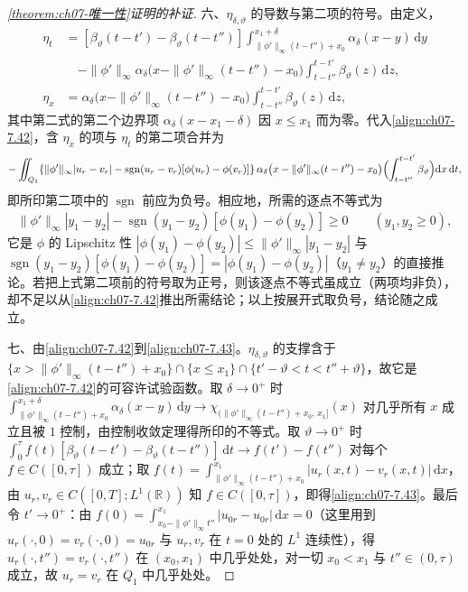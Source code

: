 \documentclass[../../main.tex]{subfiles}%
\begin{document}
\begin{proof}[\cref{theorem:ch07-唯一性}证明的补证]
六、$\eta_{\delta,\vartheta}$ 的导数与第二项的符号。由定义，
\begin{align*}
\eta_t&=[\beta_\vartheta(t-t')-\beta_\vartheta(t-t'')]\int_{\|\phi'\|_\infty(t-t'')+x_0}^{x_1+\delta}\alpha_\delta(x-y)\,\mathrm{d}y\\
&\quad-\|\phi'\|_\infty\alpha_\delta\bigl(x-\|\phi'\|_\infty(t-t'')-x_0\bigr)\int_{t-t''}^{t-t'}\beta_\vartheta(z)\,\mathrm{d}z,\\
\eta_x&=\alpha_\delta\bigl(x-\|\phi'\|_\infty(t-t'')-x_0\bigr)\int_{t-t''}^{t-t'}\beta_\vartheta(z)\,\mathrm{d}z,
\end{align*}
其中第二式的第二个边界项 $\alpha_\delta(x-x_1-\delta)$ 因 $x\leqslant x_1$ 而为零。代入\eqref{align:ch07-7.42}，含 $\eta_x$ 的项与 $\eta_t$ 的第二项合并为
\begin{align*}
-\iint_{Q_1}\{\|\phi'\|_\infty|u_r-v_r|-\operatorname{sgn}(u_r-v_r)[\phi(u_r)-\phi(v_r)]\}\,\alpha_\delta\bigl(x-\|\phi'\|_\infty(t-t'')-x_0\bigr)\Bigl(\int_{t-t''}^{t-t'}\beta_\vartheta\Bigr)\mathrm{d}x\,\mathrm{d}t,
\end{align*}
即所印第二项中的 $\operatorname{sgn}$ 前应为负号。相应地，所需的逐点不等式为
\begin{align*}
\|\phi'\|_\infty|y_1-y_2|-\operatorname{sgn}(y_1-y_2)[\phi(y_1)-\phi(y_2)]\geqslant0\qquad(y_1,y_2\geqslant0),
\end{align*}
它是 $\phi$ 的 Lipschitz 性 $|\phi(y_1)-\phi(y_2)|\leqslant\|\phi'\|_\infty|y_1-y_2|$ 与 $\operatorname{sgn}(y_1-y_2)[\phi(y_1)-\phi(y_2)]=|\phi(y_1)-\phi(y_2)|$（$y_1\ne y_2$）的直接推论。若把上式第二项前的符号取为正号，则该逐点不等式虽成立（两项均非负），却不足以从\eqref{align:ch07-7.42}推出所需结论；以上按展开式取负号，结论随之成立。

七、由\eqref{align:ch07-7.42}到\eqref{align:ch07-7.43}。$\eta_{\delta,\vartheta}$ 的支撑含于 $\{x>\|\phi'\|_\infty(t-t'')+x_0\}\cap\{x\leqslant x_1\}\cap\{t'-\vartheta<t<t''+\vartheta\}$，故它是\eqref{align:ch07-7.42}的可容许试验函数。取 $\delta\to0^+$ 时 $\int_{\|\phi'\|_\infty(t-t'')+x_0}^{x_1+\delta}\alpha_\delta(x-y)\,\mathrm{d}y\to\chi_{(\|\phi'\|_\infty(t-t'')+x_0,\,x_1]}(x)$ 对几乎所有 $x$ 成立且被 $1$ 控制，由控制收敛定理得所印的不等式。取 $\vartheta\to0^+$ 时 $\int_0^\tau f(t)[\beta_\vartheta(t-t')-\beta_\vartheta(t-t'')]\,\mathrm{d}t\to f(t')-f(t'')$ 对每个 $f\in C([0,\tau])$ 成立；取 $f(t)=\int_{\|\phi'\|_\infty(t-t'')+x_0}^{x_1}|u_r(x,t)-v_r(x,t)|\,\mathrm{d}x$，由 $u_r,v_r\in C([0,T];L^1(\mathbb{R}))$ 知 $f\in C([0,\tau])$，即得\eqref{align:ch07-7.43}。最后令 $t'\to0^+$：由 $f(0)=\int_{x_0-\|\phi'\|_\infty t''}^{x_1}|u_{0r}-u_{0r}|\,\mathrm{d}x=0$（这里用到 $u_r(\cdot,0)=v_r(\cdot,0)=u_{0r}$ 与 $u_r,v_r$ 在 $t=0$ 处的 $L^1$ 连续性），得 $u_r(\cdot,t'')=v_r(\cdot,t'')$ 在 $(x_0,x_1)$ 中几乎处处，对一切 $x_0<x_1$ 与 $t''\in(0,\tau)$ 成立，故 $u_r=v_r$ 在 $Q_1$ 中几乎处处。
\end{proof}
\end{document}
